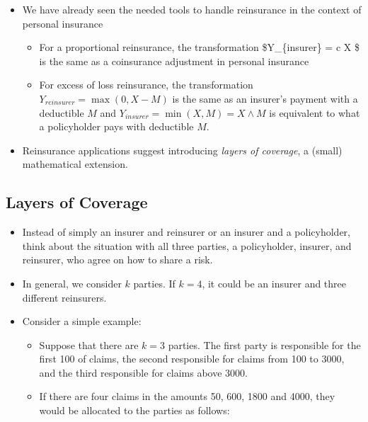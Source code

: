 \documentclass[]{book}
\begin{document}
\begin{itemize}
\item
  We have already seen the needed tools to handle reinsurance in the
  context of personal insurance

  \begin{itemize}
  \item
    For a proportional reinsurance, the transformation \$Y\_\{insurer\}
    = c X \$ is the same as a coinsurance adjustment in personal
    insurance
  \item
    For excess of loss reinsurance, the transformation
    \(Y_{reinsurer} = \max(0,X-M)\) is the same as an insurer's payment
    with a deductible \(M\) and \(Y_{insurer} = \min(X,M) = X \wedge M\)
    is equivalent to what a policyholder pays with deductible \(M\).
  \end{itemize}
\item
  Reinsurance applications suggest introducing \emph{layers of
  coverage}, a (small) mathematical extension.
\end{itemize}

\subsection{Layers of Coverage}\label{layers-of-coverage}

\begin{itemize}
\item
  Instead of simply an insurer and reinsurer or an insurer and a
  policyholder, think about the situation with all three parties, a
  policyholder, insurer, and reinsurer, who agree on how to share a
  risk.
\item
  In general, we consider \(k\) parties. If \(k=4\), it could be an
  insurer and three different reinsurers.
\item
  Consider a simple example:

  \begin{itemize}
  \item
    Suppose that there are \(k=3\) parties. The first party is
    responsible for the first 100 of claims, the second responsible for
    claims from 100 to 3000, and the third responsible for claims above
    3000.
  \item
    If there are four claims in the amounts 50, 600, 1800 and 4000, they
    would be allocated to the parties as follows:
  \end{itemize}
\end{itemize}
\end{document}
